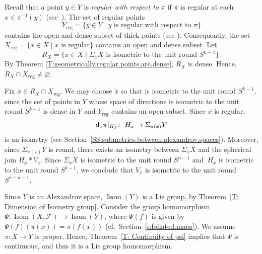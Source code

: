 \documentclass[pdftex]{sigma}
\numberwithin{equation}{section}
\theoremstyle{definition}
\DeclareMathOperator{\Iso}{Isom}
\newcommand{\Sp}{S} %
\newcommand{\fol}{\mathcal{F}}
\begin{document}
Recall that a point $y\in Y$ is \emph{regular with respect to $\pi$} if $\pi$ is regular at each $x\in \pi^{-1}(y)$ (see~\cite[Definition 6.5]{Lytchak}).
The set of regular points
\[
Y_{\mathrm{reg}}=\{y\in Y\mid y \mbox{ is regular with respect to }\pi\}
\]
contains the open and dense subset of thick points (see \cite[end of Section~6]{Lytchak}).
Consequently, the set
$
X_{\mathrm{reg}}= \{x\in X\mid x \mbox{ is regular}\}
$
contains an open and dense subset.
Let
\[
R_X = \big\{x\in X\mid \Sigma_x X \mbox{ is isometric to the unit round } \Sp^{n-1}\big\}.
\]
By Theorem \ref{T:geometrically.regular.points.are.dense}, $R_X$ is dense. Hence, $R_X\cap X_{\mathrm{reg}}\neq \varnothing$.

Fix $\bar{x}\in R_X\cap X_{\mathrm{reg}}$.
We may choose $\bar{x}$ so that  is isometric to the unit round $\Sp^{k-1}$, since the set of points in $Y$ whose space of directions is isometric to the unit round $\Sp^{k-1}$ is dense in $Y$ and $Y_{\mathrm{reg}}$ contains an open subset.
Since $\bar{x}$ is regular,
\[
{\rm d}_{\bar{x}} \pi|_{H_{\bar{x}}}\colon\ H_{\bar{x}}\to \Sigma_{\pi(\bar{x})} Y
\]
is an isometry (see Section~\ref{SS:submetries.between.alexandrov.spaces}). Moreover, since $\Sigma_{\pi(\bar{x})} Y$ is round, there exists an isometry between $\Sigma_{\bar{x}} X$ and the spherical join $H_{\bar{x}}* V_{\bar{x}}$. Since $\Sigma_{\bar{x}} X$ is isometric to the unit round $\Sp^{n-1}$ and~$H_{\bar{x}}$ is isometric to the unit round $\Sp^{k-1}$, we conclude that $V_{\bar{x}}$ is isometric to the unit round~$S^{n-k-1}$.

Since $Y$ is an Alexandrov space, $\Iso(Y)$ is a Lie group, by Theorem~\ref{T: Dimension of Isometry group}. Consider the group homomorphism
$
\Psi\colon \Iso (X,\fol) \to \Iso (Y)$,
where $\Psi(f)$ is given by
$\Psi(f)(\pi(x)) = \pi(f(x))$ (cf.\ Section~\ref{s:foliated.maps}). We assume $\pi\colon X\to Y$ is proper. Hence, Theorem~\ref{T: Continuity of psi} implies that $\Psi$ is continuous, and thus it is a Lie group homomorphism.
\end{document}
